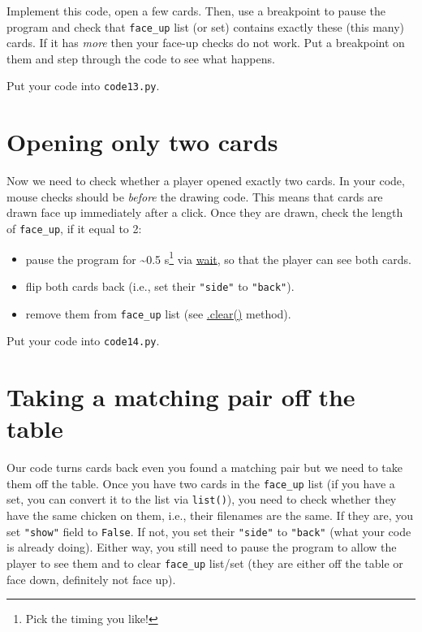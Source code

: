 \documentclass[
]{book}
\providecommand{\tightlist}{%
  \setlength{\itemsep}{0pt}\setlength{\parskip}{0pt}}
\begin{document}
Implement this code, open a few cards. Then, use a breakpoint to pause the program and check that \texttt{face\_up} list (or set) contains exactly these (this many) cards. If it has \emph{more} then your face-up checks do not work. Put a breakpoint on them and step through the code to see what happens.

Put your code into \texttt{code13.py}.

\hypertarget{opening-only-two-cards}{%
\section{Opening only two cards}\label{opening-only-two-cards}}

Now we need to check whether a player opened exactly two cards. In your code, mouse checks should be \emph{before} the drawing code. This means that cards are drawn face up immediately after a click. Once they are drawn, check the length of \texttt{face\_up}, if it equal to 2:

\begin{itemize}
\tightlist
\item
  pause the program for \textasciitilde0.5 s\footnote{Pick the timing you like!} via \href{https://psychopy.org/api/clock.html\#psychopy.clock.wait}{wait}, so that the player can see both cards.
\item
  flip both cards back (i.e., set their \texttt{"side"} to \texttt{"back"}).
\item
  remove them from \texttt{face\_up} list (see \href{https://docs.python.org/3/tutorial/datastructures.html\#more-on-lists}{.clear()} method).
\end{itemize}

Put your code into \texttt{code14.py}.

\hypertarget{taking-a-matching-pair-off-the-table}{%
\section{Taking a matching pair off the table}\label{taking-a-matching-pair-off-the-table}}

Our code turns cards back even you found a matching pair but we need to take them off the table. Once you have two cards in the \texttt{face\_up} list (if you have a set, you can convert it to the list via \texttt{list()}), you need to check whether they have the same chicken on them, i.e., their filenames are the same. If they are, you set \texttt{"show"} field to \texttt{False}. If not, you set their \texttt{"side"} to \texttt{"back"} (what your code is already doing). Either way, you still need to pause the program to allow the player to see them and to clear \texttt{face\_up} list/set (they are either off the table or face down, definitely not face up).
\end{document}
